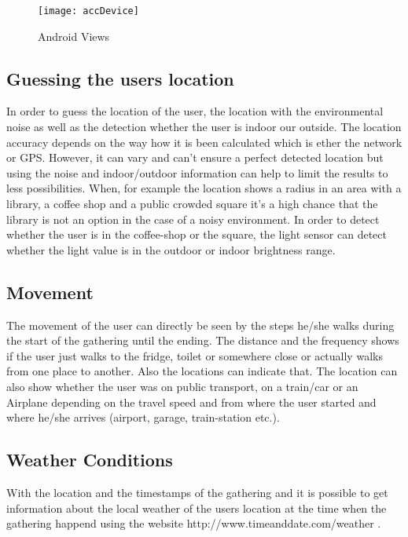 {\begin{figure}[!htb]
\centering
\texttt{[image: accDevice]}
\caption{Android Views}\label{accDev}
\vspace{10 mm}
\end{figure}

\FloatBarrier

\subsection{Guessing the users location}
In order to guess the location of the user, the location with the environmental noise as well as the detection whether the user is indoor our outside. The location accuracy depends on the way how it is been calculated which is ether the network or GPS. However, it can vary and can't ensure a perfect detected location but using the noise and indoor/outdoor information can help to limit the results to less possibilities. When, for example the location shows a radius in an area with a library, a coffee shop and a public crowded square it's a high chance that the library is not an option in the case of a noisy environment. In order to detect whether the user is in the coffee-shop or the square, the light sensor can detect whether the light value is in the outdoor or indoor brightness range. 

\subsection{Movement}
The movement of the user can directly be seen by the steps he/she walks during the start of the gathering until the ending. The distance and the frequency shows if the user just walks to the fridge, toilet or somewhere close or actually walks from one place to another. Also the locations can indicate that. 
The location can also show whether the user was on public transport, on a train/car or an Airplane depending on the travel speed and from where the user started and where he/she arrives (airport, garage, train-station etc.). 

\subsection{Weather Conditions}
With the location and the timestamps of the gathering and it is possible to get information about the local weather of the users location at the time when the gathering happend using the website   http://www.timeanddate.com/weather \cite{weatherArchive}.

}

